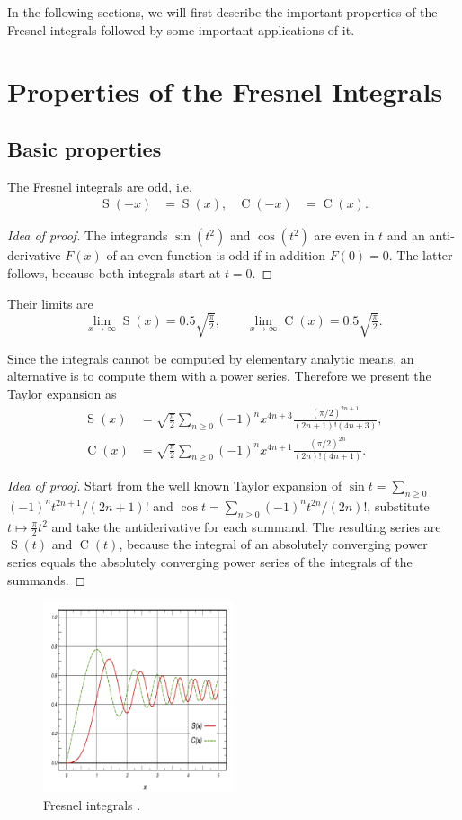 \documentclass[12pt]{article}
\DeclareMathOperator\Cee{C} %
\def\d#1{{\,\ud#1\,}}
\DeclareMathOperator\eS{S} %
\begin{document}
In the following sections, we will first describe the important properties of the Fresnel integrals followed by some important applications of it.

\section{Properties of the Fresnel Integrals}
\subsection{Basic properties}
The Fresnel integrals are odd, i.e.
\begin{align*}
	\eS(-x) &= \eS(x), & \Cee(-x) &= \Cee(x).
\end{align*}
\begin{proof}[Idea of proof]  The integrands $\sin(t^2)$ and $\cos(t^2)$ are even in $t$ and an anti-derivative $F(x)$ of an even function is odd if in addition $F(0)=0$.  The latter follows, because both integrals start at $t=0$.
\end{proof}

Their limits are
\[  \lim_{x\to\infty} \eS(x) = 0.5\sqrt{\tfrac\pi2},\qquad  \lim_{x\to\infty} \Cee(x) = 0.5\sqrt{\tfrac\pi2}.
\]

Since the integrals cannot be computed by elementary analytic means, an alternative is to compute them with a power series.  Therefore we present the Taylor expansion as
\begin{align*}
  \eS(x) &= \sqrt{\frac\pi2}\sum_{n\ge0} (-1)^nx^{4n+3}\frac{(\pi/2)^{2n+1}}{(2n+1)!(4n+3)}, \\
  \Cee(x) &= \sqrt{\frac\pi2}\sum_{n\ge0} (-1)^nx^{4n+1}\frac{(\pi/2)^{2n}}{(2n)!(4n+1)}.
\end{align*}
\begin{proof}[Idea of proof]  Start from the well known Taylor expansion of $\sin t = \sum_{n\ge0}$ $(-1)^n t^{2n+1}/(2n+1)!$ and $\cos t = \sum_{n\ge0} (-1)^nt^{2n}/(2n)!$, substitute $t\mapsto \tfrac\pi2 t^2$ and take the antiderivative for each summand.  The resulting series are $\eS(t)$ and $\Cee(t)$, because the integral of an absolutely converging power series equals the absolutely converging power series of the integrals of the summands.
\end{proof}

\begin{figure}[h!]
	\centering
	\includegraphics[width=0.5\textwidth]{Fresnel-Integrals-(Normalised).png}
	\caption{Fresnel integrals \cite{wiki}.}
\end{figure}
\end{document}

